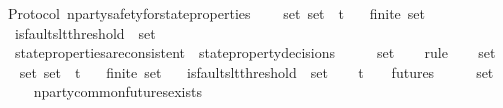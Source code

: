 \begin{isabellebody}
\ {\isacharparenleft}\ Protocol{\isacharparenright}\ n{\isacharunderscore}party{\isacharunderscore}safety{\isacharunderscore}for{\isacharunderscore}state{\isacharunderscore}properties\ {\isacharcolon}\isanewline
\ \ {\isachardoublequoteopen}{\isasymforall}\ {\isasymsigma}{\isacharunderscore}set{\isachardot}\ {\isasymsigma}{\isacharunderscore}set\ {\isasymsubseteq}\ {\isasymSigma}t\isanewline
\ \ {\isasymlongrightarrow}\ finite\ {\isasymsigma}{\isacharunderscore}set\isanewline
\ \ {\isasymlongrightarrow}\ is{\isacharunderscore}faults{\isacharunderscore}lt{\isacharunderscore}threshold\ {\isacharparenleft}{\isasymUnion}\ {\isasymsigma}{\isacharunderscore}set{\isacharparenright}\isanewline
\ \ {\isasymlongrightarrow}\ state{\isacharunderscore}properties{\isacharunderscore}are{\isacharunderscore}consistent\ {\isacharparenleft}{\isasymUnion}\ {\isacharbraceleft}state{\isacharunderscore}property{\isacharunderscore}decisions\ {\isasymsigma}\ {\isacharbar}\ {\isasymsigma}{\isachardot}\ {\isasymsigma}\ {\isasymin}\ {\isasymsigma}{\isacharunderscore}set{\isacharbraceright}{\isacharparenright}{\isachardoublequoteclose}\isanewline
%
\isadelimproof
\ \ %
\endisadelimproof
%
\isatagproof
{}\isamarkupfalse%
\ rule{\isacharplus}\isanewline
{}\isamarkupfalse%
{\isacharminus}\isanewline
\ \ \isamarkupfalse%
\ {\isasymsigma}{\isacharunderscore}set\isanewline
\ \ \isamarkupfalse%
\ {\isasymsigma}{\isacharunderscore}set{\isacharcolon}\ {\isachardoublequoteopen}{\isasymsigma}{\isacharunderscore}set\ {\isasymsubseteq}\ {\isasymSigma}t{\isachardoublequoteclose}\isanewline
\ \ \ {\isachardoublequoteopen}finite\ {\isasymsigma}{\isacharunderscore}set{\isachardoublequoteclose}\isanewline
\ \ \ {\isachardoublequoteopen}is{\isacharunderscore}faults{\isacharunderscore}lt{\isacharunderscore}threshold\ {\isacharparenleft}{\isasymUnion}\ {\isasymsigma}{\isacharunderscore}set{\isacharparenright}{\isachardoublequoteclose}\isanewline
\ \ \isamarkupfalse%
\ {\isachardoublequoteopen}{\isasymexists}{\isasymsigma}{\isasymin}{\isasymSigma}t{\isachardot}\ {\isasymsigma}\ {\isasymin}\ {\isasymInter}\ {\isacharbraceleft}futures\ {\isasymsigma}\ {\isacharbar}\ {\isasymsigma}{\isachardot}\ {\isasymsigma}\ {\isasymin}\ {\isasymsigma}{\isacharunderscore}set{\isacharbraceright}{\isachardoublequoteclose}\isanewline
\ \ \ \ \isamarkupfalse%
\ n{\isacharunderscore}party{\isacharunderscore}common{\isacharunderscore}futures{\isacharunderscore}exists\ \isamarkupfalse%

\end{isabellebody}
